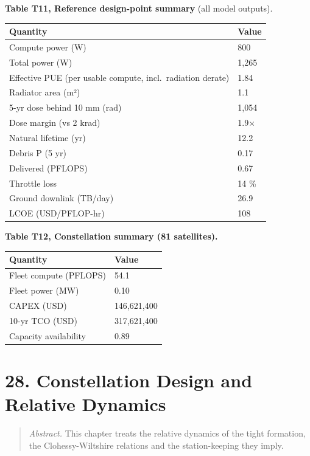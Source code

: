 \documentclass[
  11pt,
  openany,
  oneside]{book}
\newcounter{none} %
\begin{document}
\textbf{Table T11, Reference design-point summary} (all model outputs).

{\def\LTcaptype{none} %
\begin{longtable}[]{@{}ll@{}}
\toprule\noalign{}
Quantity & Value \\
\midrule\noalign{}
\endhead
\bottomrule\noalign{}
\endlastfoot
Compute power (W) & 800 \\
Total power (W) & 1,265 \\
Effective PUE (per usable compute, incl.~radiation derate) & 1.84 \\
Radiator area (m²) & 1.1 \\
5-yr dose behind 10 mm (rad) & 1,054 \\
Dose margin (vs 2 krad) & 1.9× \\
Natural lifetime (yr) & 12.2 \\
Debris P (5 yr) & 0.17 \\
Delivered (PFLOPS) & 0.67 \\
Throttle loss & 14 \% \\
Ground downlink (TB/day) & 26.9 \\
LCOE (USD/PFLOP-hr) & 108 \\
\end{longtable}
}

\textbf{Table T12, Constellation summary (81 satellites).}

{\def\LTcaptype{none} %
\begin{longtable}[]{@{}ll@{}}
\toprule\noalign{}
Quantity & Value \\
\midrule\noalign{}
\endhead
\bottomrule\noalign{}
\endlastfoot
Fleet compute (PFLOPS) & 54.1 \\
Fleet power (MW) & 0.10 \\
CAPEX (USD) & 146,621,400 \\
10-yr TCO (USD) & 317,621,400 \\
Capacity availability & 0.89 \\
\end{longtable}
}

\chapter{28. Constellation Design and Relative
Dynamics}\label{constellation-design-and-relative-dynamics}

\begin{quote}
\emph{Abstract.} This chapter treats the relative dynamics of the tight
formation, the Clohessy-Wiltshire relations and the station-keeping they
imply.
\end{quote}
\end{document}
